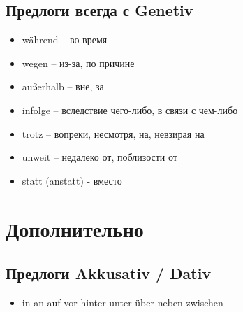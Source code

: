 \subsection{Предлоги всегда с Genetiv}

\begin{itemize}
\item während -- во время
\item wegen -- из-за, по причине
\item außerhalb -- вне, за
\item infolge -- вследствие чего-либо, в связи с чем-либо
\item trotz -- вопреки, несмотря, на, невзирая на
\item unweit -- недалеко от, поблизости от
\item statt (anstatt) - вместо
\end{itemize}

\section{Дополнительно}

\subsection{Предлоги Akkusativ / Dativ}
\begin{itemize}
\item in an auf vor hinter unter über neben zwischen 
\end{itemize}


